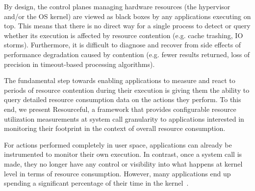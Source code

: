 \documentclass[12pt,twoside,a4paper]{article}
\newcommand{\pname}{Resourceful}
\newcommand{\lnote}[1]{\textcolor{red}{[\textit{#1}]}} %
\begin{document}
By design, the control planes managing hardware resources (the hypervisor and/or
the OS kernel) are viewed as black boxes by any applications executing on top.
This means that there is no direct way for a single process to detect or query
whether its execution is affected by resource contention (e.g. cache trashing, IO
storms). Furthermore, it is difficult to diagnose and recover from side effects
of performance degradation caused by contention (e.g. fewer results returned, loss of
precision in timeout-based processing algorithms).



The fundamental step towards enabling applications to measure and react to periods of
resource contention during their execution is giving them the ability to query
detailed resource consumption data on the actions they perform. To this end, we
present \pname, a framework that provides configurable resource utilization
measurements at system call granularity to applications interested in monitoring
their footprint in the context of overall resource consumption.

For actions performed completely in user space, applications can already be
instrumented to monitor their own execution. In contrast, once a system call is
made, they no longer have any control or visibility into what happens at kernel
level in terms of resource consumption. However, many applications end up
spending a significant percentage of their time in the
kernel~\cite{boyd2010analysis}.
\end{document}
